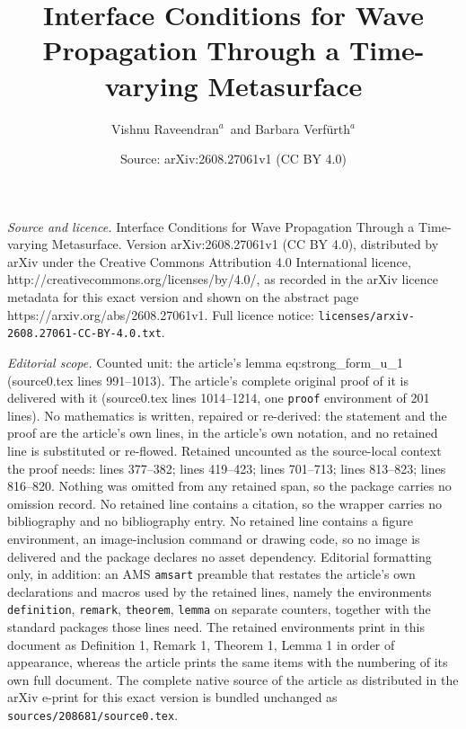 \documentclass[10pt,a4paper]{amsart}
\title{Interface Conditions for Wave Propagation Through a Time-varying Metasurface}
\author{Vishnu Raveendran$^a$\, and Barbara Verfürth$^a$}
\date{Source: arXiv:2608.27061v1 (CC BY 4.0)}
\begin{document}
\maketitle

\noindent\emph{Source and licence.} Interface Conditions for Wave Propagation Through a Time-varying Metasurface. Version arXiv:2608.27061v1 (CC BY 4.0), distributed by arXiv under the Creative Commons Attribution 4.0 International licence, http://creativecommons.org/licenses/by/4.0/, as recorded in the arXiv licence metadata for this exact version and shown on the abstract page https://arxiv.org/abs/2608.27061v1. Full licence notice: \texttt{licenses/arxiv-2608.27061-CC-BY-4.0.txt}.\par\smallskip

\noindent\textit{Editorial scope.} Counted unit: the article's lemma eq:strong\_form\_u\_1 (source0.tex lines 991--1013). The article's complete original proof of it is delivered with it (source0.tex lines 1014--1214, one \texttt{proof} environment of 201 lines). No mathematics is written, repaired or re-derived: the statement and the proof are the article's own lines, in the article's own notation, and no retained line is substituted or re-flowed.  Retained uncounted as the source-local context the proof needs: lines 377--382; lines 419--423; lines 701--713; lines 813--823; lines 816--820.  Nothing was omitted from any retained span, so the package carries no omission record.  No retained line contains a citation, so the wrapper carries no bibliography and no bibliography entry.  No retained line contains a figure environment, an image-inclusion command or drawing code, so no image is delivered and the package declares no asset dependency.  Editorial formatting only, in addition: an AMS \texttt{amsart} preamble that restates the article's own declarations and macros used by the retained lines, namely the environments \texttt{definition}, \texttt{remark}, \texttt{theorem}, \texttt{lemma} on separate counters, together with the standard packages those lines need.  The retained environments print in this document as Definition 1, Remark 1, Theorem 1, Lemma 1 in order of appearance, whereas the article prints the same items with the numbering of its own full document.  The complete native source of the article as distributed in the arXiv e-print for this exact version is bundled unchanged as \texttt{sources/208681/source0.tex}.
\end{document}
